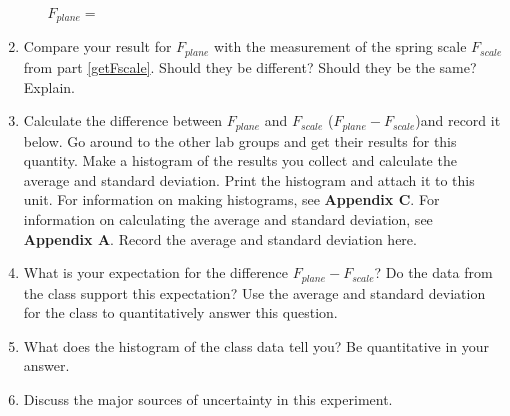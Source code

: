 \begin{enumerate}
\begin{enumerate}
\( F_{plane} =\)  \vspace{30mm}

\end{enumerate}

\item Compare your result for \( F_{plane} \) with the measurement of the spring
scale \( F_{scale} \) from part \ref{getFscale}. Should they be different? Should they be the same? Explain.
\vspace{30mm}


\item Calculate the difference between \( F_{plane} \) and \( F_{scale} \) (\( F_{plane} - F_{scale} \))and record it below.
Go around to the other lab groups and get their results for this quantity.
Make a histogram of the results you collect and calculate the average and standard deviation.
Print the histogram and attach it to this unit.
For information on making histograms, see \textbf{Appendix C}. For information on calculating the average and
standard deviation, see \textbf{Appendix A}. Record the average and standard deviation here.
\vspace{30mm}

\newpage

\item What is your expectation for the difference \( F_{plane} - F_{scale} \)?
Do the data from the class support this expectation? 
Use the average and standard deviation for the class to quantitatively answer this question.
\vspace{15mm}

\item What does the histogram of the class data tell you? Be quantitative in your answer.
\vspace{15mm}

\item Discuss the major sources of uncertainty in this experiment.
\vspace{15mm}

\end{enumerate}
